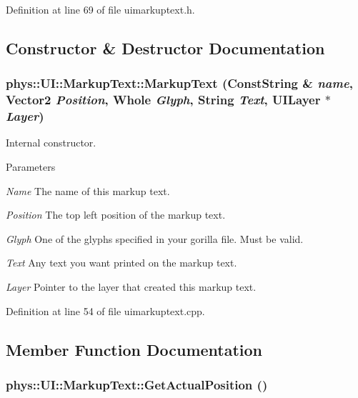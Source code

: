 Definition at line 69 of file uimarkuptext.h.



\subsection{Constructor \& Destructor Documentation}
\hypertarget{classphys_1_1UI_1_1MarkupText_a00e09eb3d72ff569b41f0bc42a396707}{
\subsubsection[{MarkupText}]{\setlength{\rightskip}{0pt plus 5cm}phys::UI::MarkupText::MarkupText ({\bf ConstString} \& {\em name}, \/  {\bf Vector2} {\em Position}, \/  {\bf Whole} {\em Glyph}, \/  {\bf String} {\em Text}, \/  {\bf UILayer} $\ast$ {\em Layer})}}
\label{d7/d23/classphys_1_1UI_1_1MarkupText_a00e09eb3d72ff569b41f0bc42a396707}


Internal constructor. 


\begin{DoxyParams}{Parameters}
\item[{\em Name}]The name of this markup text. \item[{\em Position}]The top left position of the markup text. \item[{\em Glyph}]One of the glyphs specified in your gorilla file. Must be valid. \item[{\em Text}]Any text you want printed on the markup text. \item[{\em Layer}]Pointer to the layer that created this markup text. \end{DoxyParams}


Definition at line 54 of file uimarkuptext.cpp.



\subsection{Member Function Documentation}
\hypertarget{classphys_1_1UI_1_1MarkupText_a1e5bfba8d1686cb4188793fd695c7090}{
\subsubsection[{GetActualPosition}]{ phys::UI::MarkupText::GetActualPosition ()}}
\label{d7/d23/classphys_1_1UI_1_1MarkupText_a1e5bfba8d1686cb4188793fd695c7090}


